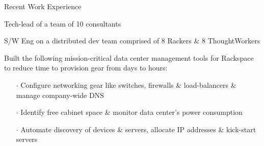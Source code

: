 \documentclass{resume} %
\begin{document}
\begin{rSection}{Recent Work Experience}
\begin{rSubsection}{}{}{}{}{Tech-lead of a team of 10 consultants}
\end{rSubsection}\vspace{-1em}



\begin{rSubsection}{}{}{}{}
{S/W Eng on a distributed dev team comprised of 8 Rackers \& 8 ThoughtWorkers}

\item Built the following mission-critical data center management tools for Rackspace to reduce time to provision gear from days to hours:
\vspace{-0.5em}
\begin{itemize}  \itemsep0.5pt \parskip0pt
    \item[$\cdot$] Configure networking gear like switches, firewalls \& load-balancers \& manage company-wide DNS
    \item[$\cdot$] Identify free cabinet space \& monitor data center's power consumption
    \item[$\cdot$] Automate discovery of devices \& servers, allocate IP addresses \& kick-start servers
\end{itemize}

\end{rSubsection}








\end{rSection}
\end{document}
